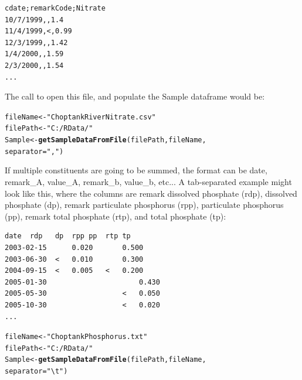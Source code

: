 \documentclass[a4paper,11pt]{article}\usepackage[]{graphicx}\usepackage[]{color}
\makeatletter
\newcommand{\hlstr}[1]{\textcolor[rgb]{0.192,0.494,0.8}{#1}}%
\newcommand{\hlstd}[1]{\textcolor[rgb]{0.345,0.345,0.345}{#1}}%
\newcommand{\hlkwb}[1]{\textcolor[rgb]{0.69,0.353,0.396}{#1}}%
\newcommand{\hlkwc}[1]{\textcolor[rgb]{0.333,0.667,0.333}{#1}}%
\newcommand{\hlkwd}[1]{\textcolor[rgb]{0.737,0.353,0.396}{\textbf{#1}}}%
\newenvironment{kframe}{%
 \def\at@end@of@kframe{}%
 \ifinner\ifhmode%
  \def\at@end@of@kframe{\end{minipage}}%
  \begin{minipage}{\columnwidth}%
 \fi\fi%
 \def\FrameCommand##1{\hskip\@totalleftmargin \hskip-\fboxsep
 \colorbox{shadecolor}{##1}\hskip-\fboxsep
     \hskip-\linewidth \hskip-\@totalleftmargin \hskip\columnwidth}%
 \MakeFramed {\advance\hsize-\width
   \@totalleftmargin\z@ \linewidth\hsize
   \@setminipage}}%
 {\par\unskip\endMakeFramed%
 \at@end@of@kframe}
\newenvironment{knitrout}{}{} %
\makeatother
\begin{document}
\begin{verbatim}
cdate;remarkCode;Nitrate
10/7/1999,,1.4
11/4/1999,<,0.99
12/3/1999,,1.42
1/4/2000,,1.59
2/3/2000,,1.54
...
\end{verbatim}
The call to open this file, and populate the Sample dataframe would be:
\begin{knitrout}
\color{fgcolor}\begin{kframe}
\begin{alltt}
\hlstd{fileName} \hlkwb{<-} \hlstr{"ChoptankRiverNitrate.csv"}
\hlstd{filePath} \hlkwb{<-}  \hlstr{"C:/RData/"}
\hlstd{Sample} \hlkwb{<-} \hlkwd{getSampleDataFromFile}\hlstd{(filePath,fileName,}
                                \hlkwc{separator}\hlstd{=}\hlstr{","}\hlstd{)}
\end{alltt}
\end{kframe}
\end{knitrout}


If multiple constituents are going to be summed, the format can be date, remark\_A, value\_A, remark\_b, value\_b, etc... A tab-separated example might look like this, where the columns are remark dissolved phosphate (rdp), dissolved phosphate (dp), remark particulate phosphorus (rpp), particulate phosphorus (pp), remark total phosphate (rtp), and total phosphate (tp):
\begin{verbatim}
date  rdp	dp	rpp	pp	rtp	tp
2003-02-15		0.020		0.500		
2003-06-30	<	0.010		0.300		
2004-09-15	<	0.005	<	0.200		
2005-01-30						0.430
2005-05-30					<	0.050
2005-10-30					<	0.020
...
\end{verbatim}

\begin{knitrout}
\color{fgcolor}\begin{kframe}
\begin{alltt}
\hlstd{fileName} \hlkwb{<-} \hlstr{"ChoptankPhosphorus.txt"}
\hlstd{filePath} \hlkwb{<-}  \hlstr{"C:/RData/"}
\hlstd{Sample} \hlkwb{<-} \hlkwd{getSampleDataFromFile}\hlstd{(filePath,fileName,}
                                \hlkwc{separator}\hlstd{=}\hlstr{"\textbackslash{}t"}\hlstd{)}
\end{alltt}
\end{kframe}
\end{knitrout}



\FloatBarrier

\end{document}
